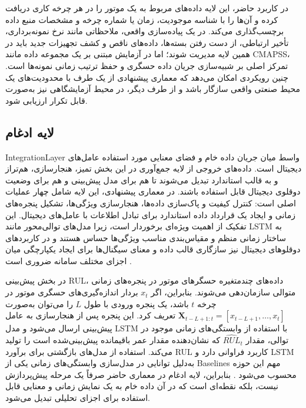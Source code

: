در کاربرد حاضر، این لایه داده‌های مربوط به یک موتور را در هر چرخه کاری دریافت کرده و آن‌ها را با شناسه موجودیت، زمان یا شماره چرخه و مشخصات منبع داده برچسب‌گذاری می‌کند. در یک پیاده‌سازی واقعی، ملاحظاتی مانند نرخ نمونه‌برداری، تأخیر ارتباطی، از دست رفتن بسته‌ها، داده‌های ناقص و کشف تجهیزات جدید باید در همین لایه مدیریت شوند؛ اما در آزمایش مبتنی بر یک مجموعه داده مانند \gls{CMAPSS}، تمرکز اصلی بر شبیه‌سازی جریان داده حسگری و حفظ ترتیب زمانی نمونه‌ها است. چنین رویکردی امکان می‌دهد که معماری پیشنهادی از یک طرف با محدودیت‌های یک محیط صنعتی واقعی سازگار باشد و از طرف دیگر، در محیط آزمایشگاهی نیز به‌صورت قابل تکرار ارزیابی شود.


\subsection{لایه ادغام}
\label{sec:layer-integration}

\gls{IntegrationLayer} واسط میان جریان داده خام و فضای معنایی مورد استفاده عامل‌های دیجیتال است. داده‌های خروجی از لایه جمع‌آوری در این بخش تمیز، هنجارسازی، هم‌تراز و به قالب استاندارد تبدیل می‌شوند تا هم برای مدل پیش‌بینی و هم برای وضعیت دوقلوی دیجیتال قابل استفاده باشند. در معماری پیشنهادی، این لایه شامل چهار عملیات اصلی است: کنترل کیفیت و پاک‌سازی داده‌ها، هنجارسازی ویژگی‌ها، تشکیل پنجره‌های زمانی و ایجاد یک قرارداد داده استاندارد برای تبادل اطلاعات با عامل‌های دیجیتال. این تفکیک از اهمیت ویژه‌ای برخوردار است، زیرا مدل‌های توالی‌محور مانند LSTM به ساختار زمانی منظم و مقیاس‌بندی مناسب ویژگی‌ها حساس هستند \cite{heimes2008recurrent} و در کاربردهای  دوقلو‌های دیجیتال نیز سازگاری قالب داده و معنای سیگنال‌ها برای ایجاد یکپارچگی میان اجزای مختلف سامانه ضروری است \cite{qi2021enabling}.

در بخش پیش‌بینی \gls{RUL}، داده‌های چندمتغیره حسگرهای موتور در پنجره‌های زمانی متوالی سازمان‌دهی می‌شوند. بنابراین، اگر $x_t$ بردار اندازه‌گیری‌های حسگری موتور در چرخه $t$ باشد، یک پنجره ورودی با طول $L$ را می‌توان به‌صورت $\mathbf{X}_{t-L+1:t}=[x_{t-L+1},\ldots,x_t]$ تعریف کرد. این پنجره پس از هنجارسازی به عامل پیش‌بینی ارسال می‌شود و مدل LSTM با استفاده از وابستگی‌های زمانی موجود در توالی، مقدار $\widehat{RUL}_t$ که نشان‌دهنده مقدار عمر باقیمانده پیش‌بینی‌شده است را تولید می‌کند. استفاده از مدل‌های بازگشتی برای برآورد \gls{RUL} کاربرد فراوانی دارد و LSTM به‌دلیل توانایی در مدل‌سازی وابستگی‌های زمانی یکی از \glspl{Baseline} مهم این حوزه محسوب می‌شود \cite{heimes2008recurrent,park2026hybriddt}. بنابراین، لایه ادغام در معماری حاضر صرفاً یک مرحله پیش‌پردازش نیست، بلکه نقطه‌ای است که در آن داده خام به یک نمایش زمانی و معنایی قابل استفاده برای اجزای تحلیلی تبدیل می‌شود.

